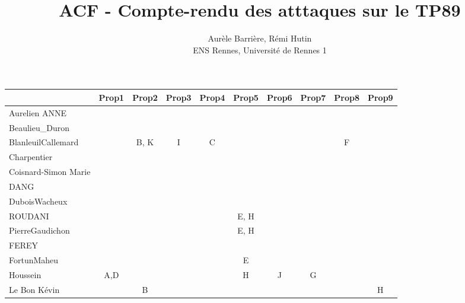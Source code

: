 \documentclass[a4paper]{article}
\begin{document}
\title{ACF - Compte-rendu des atttaques sur le TP89}
\author{Aurèle Barrière, Rémi Hutin \\ ENS Rennes, Université de Rennes 1}

\maketitle

\begin{table}[h!]
\small
\begin{tabular}{|l|c|c|c|c|c|c|c|c|c|} 
   \hline
                            & Prop1 & Prop2 & Prop3 & Prop4 & Prop5 & Prop6 & Prop7 & Prop8 & Prop9 \\ \hline \hline
    Aurelien ANNE           &       &       &       &       &       &       &       &       &       \\ \hline
    Beaulieu\_Duron         &       &       &       &       &       &       &       &       &       \\ \hline
    BlanleuilCallemard      &       & B, K  & I     & C     &       &       &       & F     &       \\ \hline
    Charpentier             &       &       &       &       &       &       &       &       &       \\ \hline
    Coisnard-Simon Marie    &       &       &       &       &       &       &       &       &       \\ \hline
    DANG                    &       &       &       &       &       &       &       &       &       \\ \hline
    DuboisWacheux           &       &       &       &       &       &       &       &       &       \\ \hline
    ROUDANI                 &       &       &       &       & E, H  &       &       &       &       \\ \hline
    PierreGaudichon         &       &       &       &       & E, H  &       &       &       &       \\ \hline
    FEREY                   &       &       &       &       &       &       &       &       &       \\ \hline
    FortunMaheu             &       &       &       &       & E     &       &       &       &       \\ \hline
    Houssein                & A,D   &       &       &       & H     & J     & G     &       &       \\ \hline
    Le Bon Kévin            &       & B     &       &       &       &       &       &       & H     \\ \hline

\end{tabular}
\end{table}
\end{document}
